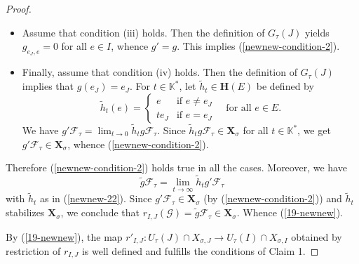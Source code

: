 \documentclass[12pt]{amsart}
\theoremstyle{definition}
\begin{document}
\begin{proof}
\begin{itemize}
Applying this observation to $\mathcal{F}=g\mathcal{F}_\tau$ (and noting that $\tau(e_J)=\sigma(e_J)$ because $\tau\in W(I)\cdot\sigma$), we deduce that $g_{e_J,e}=0$ for all $e\not=e_J$, whence $g'=g$. This clearly yields (\ref{newnew-condition-2}) in this case.
\item Assume that condition {\rm (iii)} holds. Then the definition of $G_\tau(J)$ yields $g_{e_J,e}=0$ for all $e\in I$, whence $g'=g$. This implies (\ref{newnew-condition-2}).
\item Finally, assume that condition {\rm (iv)} holds. Then the definition of $G_\tau(J)$ implies that $g(e_J)=e_J$. 
For $t\in\mathbb{K}^*$, let $\tilde{h}_t\in \mathbf{H}(E)$ be defined by
\begin{equation}
\label{newnew-22}
\tilde{h}_t(e)=\left\{\begin{array}{ll}
e & \mbox{if $e\not=e_J$} \\
te_J & \mbox{if $e=e_J$}
\end{array} \quad\mbox{for all $e\in E$.}\right.
\end{equation}
We have $g'\mathcal{F}_\tau=\lim_{t\to 0}\tilde{h}_tg\mathcal{F}_\tau$.
Since $\tilde{h}_tg\mathcal{F}_\tau\in\mathbf{X}_\sigma$ for all $t\in\mathbb{K}^*$, we get $g'\mathcal{F}_\tau\in\mathbf{X}_\sigma$, whence (\ref{newnew-condition-2}).
\end{itemize}
Therefore (\ref{newnew-condition-2}) holds true in all the cases.
Moreover, we have
\[\tilde{g}\mathcal{F}_\tau=\lim_{t\to \infty}\tilde{h}_{t}g'\mathcal{F}_\tau\]
with $\tilde{h}_t$ as in (\ref{newnew-22}).
Since $g'\mathcal{F}_\tau\in\mathbf{X}_\sigma$ (by (\ref{newnew-condition-2})) and $\tilde{h}_t$ stabilizes $\mathbf{X}_\sigma$, we conclude that $r_{I,J}(\mathcal{G})=\tilde{g}\mathcal{F}_\tau\in\mathbf{X}_\sigma$.
Whence (\ref{19-newnew}).

By (\ref{19-newnew}),
the map $r'_{I,J}:U_{\tau}(J)\cap
X_{\sigma,J}\to U_{\tau}(I)\cap X_{\sigma,I}$ obtained by
restriction of $r_{I,J}$ is well defined and fulfills the conditions of Claim 1.



\end{proof}
\end{document}
